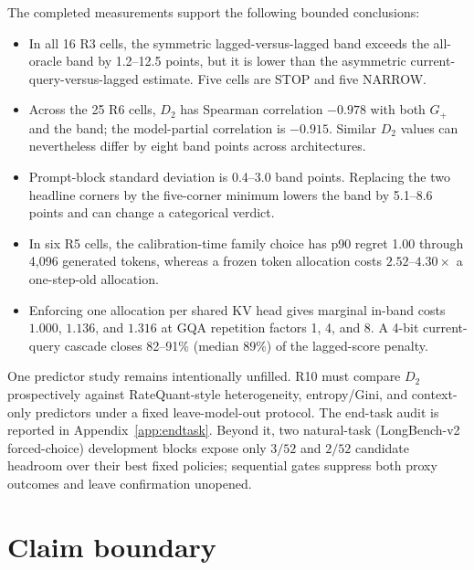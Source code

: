 The completed measurements support the following bounded conclusions:
\begin{itemize}
 \item In all 16 R3 cells, the symmetric lagged-versus-lagged band exceeds the
 all-oracle band by 1.2--12.5 points, but it is lower than the asymmetric
 current-query-versus-lagged estimate.  Five cells are STOP and five NARROW.
 \item Across the 25 R6 cells, $D_2$ has Spearman correlation $-0.978$ with both
 $G_+$ and the band; the model-partial correlation is $-0.915$.  Similar $D_2$
 values can nevertheless differ by eight band points across architectures.
 \item Prompt-block standard deviation is 0.4--3.0 band points.  Replacing the
 two headline corners by the five-corner minimum lowers the band by 5.1--8.6
 points and can change a categorical verdict.
 \item In six R5 cells, the calibration-time family choice has p90 regret 1.00
 through 4,096 generated tokens, whereas a frozen token allocation costs
 $2.52$--$4.30\times$ a one-step-old allocation.
 \item Enforcing one allocation per shared KV head gives marginal in-band costs
 $1.000$, $1.136$, and $1.316$ at GQA repetition factors 1, 4, and 8.  A 4-bit
 current-query cascade closes 82--91\% (median 89\%) of the lagged-score penalty.
\end{itemize}

One predictor study remains intentionally unfilled.  R10 must compare $D_2$
prospectively against RateQuant-style heterogeneity, entropy/Gini, and
context-only predictors under a fixed leave-model-out protocol.  The end-task
audit is reported in Appendix~\ref{app:endtask}.  Beyond it, two natural-task
(LongBench-v2 forced-choice) development blocks expose only $3/52$ and $2/52$
candidate headroom over their best fixed policies; sequential gates suppress
both proxy outcomes and leave confirmation unopened.

\section{Claim boundary}
\label{app:claims}

